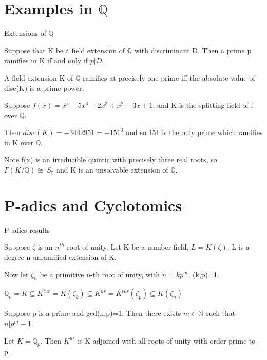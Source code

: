 \documentclass[10pt]{beamer}
\theoremstyle{plain} %
\begin{document}
\section{Examples in $\mathbb{Q}$}
\begin{frame}{Extensions of $\mathbb{Q}$}
    \begin{theorem}
     Suppose that K be a field extension of $\mathbb{Q}$ with discriminant D. Then a prime p
ramifies in K if and only if $p|D$.   
    \end{theorem}
    \begin{corollary}
A field extension K of $\mathbb{Q}$ ramifies at precisely one prime iff the absolute value of disc(K) is a prime power.
\end{corollary}
\begin{example}
    Suppose $f(x)=x^5-5x^4-2x^3+x^2-3x+1$, and K is the splitting field of f over $\mathbb{Q}$. \par Then $disc(K)=-3442951=-151^3$ and so 151 is the only prime which ramifies in K over $\mathbb{Q}$. \par Note f(x) is an irreducible quintic with precisely three real roots, so $\Gamma(K/\mathbb{Q})\cong\ S_5$ and K is an unsolvable extension of $\mathbb{Q}$.
\end{example}
\end{frame}
\section{P-adics and Cyclotomics}
\begin{frame}{P-adics results}

\begin{theorem}
   Suppose $\zeta$ is an $n^{th}$ root of unity. Let K be a number field, $L=K(\zeta)$. 
L is a degree n unramified extension of K. 
\end{theorem}

Now let $\zeta_n$ be a primitive n-th root of unity, with $n=kp^{m}$, (k,p)=1.
\begin{example}
      $\mathbb{Q}_{p}=K\subseteq K^{tur}=K(\zeta_k)\subseteq K^{ur} = K^{tur}(\zeta_{p})\subseteq K(\zeta_n)$
\end{example}
\begin{lemma}
Suppose p is a prime and gcd(n,p)=1. Then there exists $m\in\mathbb{N}$ such that $n|p^m-1$.
\end{lemma}
\begin{theorem}
    Let $K=\mathbb{Q}_p$. Then $K^{ur}$ is K adjoined with all roots of unity with order prime to p. 
\end{theorem}

\end{frame}
\end{document}
